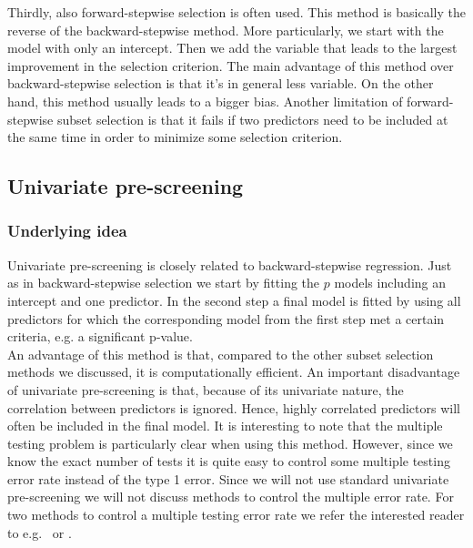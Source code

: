 Thirdly, also forward-stepwise selection is often used. This method is basically the reverse of the backward-stepwise method. More particularly, we start with the model with only an intercept. Then we add the variable that leads to the largest improvement in the selection criterion. The main advantage of this method over backward-stepwise selection is that it's in general less variable. On the other hand, this method usually leads to a bigger bias. Another limitation of forward-stepwise subset selection is that it fails if two predictors need to be included at the same time in order to minimize some selection criterion.\\

\subsection{Univariate pre-screening}
\subsubsection{Underlying idea}
Univariate pre-screening is closely related to backward-stepwise regression. Just as in backward-stepwise selection we start by fitting the $p$ models including an intercept and one predictor. In the second step a final model is fitted by using all predictors for which the corresponding model from the first step met a certain criteria, e.g. a significant p-value. \\

An advantage of this method is that, compared to the other subset selection methods we discussed, it is computationally efficient. 
An important disadvantage of univariate pre-screening is that, because of its univariate nature, the correlation between predictors is ignored. Hence, highly correlated predictors will often be included in the final model. It is interesting to note that the multiple testing problem is particularly clear when using this method. However, since we know the exact number of tests it is quite easy to control some multiple testing error rate instead of the type 1 error. Since we will not use standard univariate pre-screening we will not discuss methods to control the multiple error rate. For two methods to control a multiple testing error rate we refer the interested reader to e.g.\ \cite{holm_simple_1979} or \cite{benjamini_controlling_1995}.

